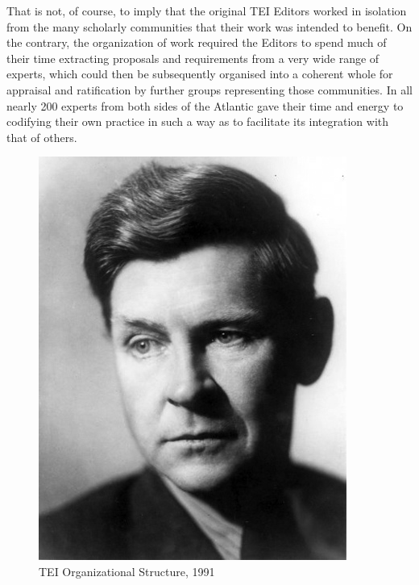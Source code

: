 \documentclass[11pt,twoside]{article}\makeatletter
\begin{document}
That is not, of course, to imply that the original TEI Editors worked in isolation from the many scholarly communities that their work was intended to benefit. On the contrary, the organization of work required the Editors to spend much of their time extracting proposals and requirements from a very wide range of experts, which could then be subsequently organised into a coherent whole for appraisal and ratification by further groups representing those communities. In all nearly 200 experts from both sides of the Atlantic gave their time and energy to codifying their own practice in such a way as to facilitate its integration with that of others. \begin{figure}[htbp]
\begin{center}\noindent\includegraphics[height=0.9\textheight,]{portrait.jpg}
\caption{\label{TEI91}TEI Organizational Structure, 1991}\end{center}\end{figure}
  
\end{document}
